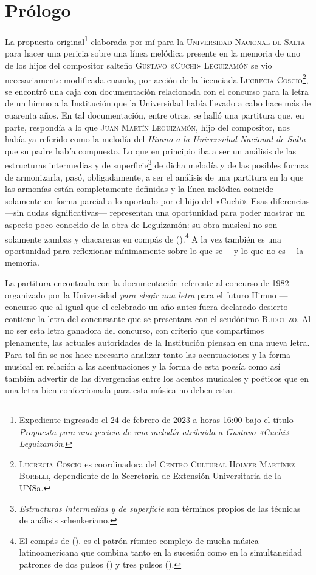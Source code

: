 \chapter{Prólogo}
\label{cap:prologo}

La propuesta original\footnote{Expediente ingresado el 24 de febrero de 2023 a horas 16:00 bajo el título \emph{Propuesta para una pericia de una melodía atribuida a Gustavo «Cuchi» Leguizamón}.} elaborada por mí para la \textsc{Universidad Nacional de Salta} para hacer una pericia sobre una línea melódica presente en la memoria de uno de los hijos del compositor salteño \textsc{Gustavo «Cuchi» Leguizamón} se vio necesariamente modificada cuando, por acción de la licenciada \textsc{Lucrecia Coscio}\footnote{\textsc{Lucrecia Coscio} es coordinadora del \textsc{Centro Cultural Holver Martínez Borelli}, dependiente de la Secretaría de Extensión Universitaria de la UNSa. }, se encontró una caja con documentación relacionada con el concurso para la letra de un himno a la Institución que la Universidad había llevado a cabo hace más de cuarenta años. En tal documentación, entre otras, se halló una partitura que, en parte, respondía a lo que \textsc{Juan Martín Leguizamón}, hijo del compositor, nos había ya referido como la melodía del \emph{Himno a la Universidad Nacional de Salta} que su padre había compuesto. Lo que en principio iba a ser un análisis de las estructuras intermedias y de superficie\footnote{\emph{Estructuras intermedias y de superficie} son términos propios de las técnicas de análisis schenkeriano.} de dicha melodía y de las posibles formas de armonizarla, pasó, obligadamente, a ser el análisis de una partitura en la que las armonías están completamente definidas y la línea melódica coincide solamente en forma parcial a lo aportado por el hijo del «Cuchi». Esas diferencias ---sin dudas significativas--- representan una oportunidad para poder mostrar un aspecto poco conocido de la obra de Leguizamón: su obra musical no son solamente zambas y chacareras en compás de \hbox{().}\footnote{El compás de \hbox{().} es el patrón rítmico complejo de mucha música latinoamericana que combina tanto en la sucesión como en la simultaneidad patrones de dos pulsos () y tres pulsos ().} A la vez también es una oportunidad para reflexionar mínimamente sobre lo que se ---y lo que no es--- la memoria.

La partitura encontrada con la documentación referente al concurso de 1982 organizado por la Universidad \emph{para elegir una letra} para el futuro Himno ---concurso que al igual que el celebrado un año antes fuera declarado desierto--- contiene la letra del concursante que se presentara con el seudónimo \textsc{Budotizo}. Al no ser esta letra ganadora del concurso, con criterio que compartimos plenamente, las actuales autoridades de la Institución piensan en una nueva letra. Para tal fin se nos hace necesario analizar tanto las acentuaciones y la forma musical en relación a las acentuaciones y la forma de esta poesía como así también advertir de las divergencias entre los acentos musicales y poéticos que en una letra bien confeccionada para esta música no deben estar.

